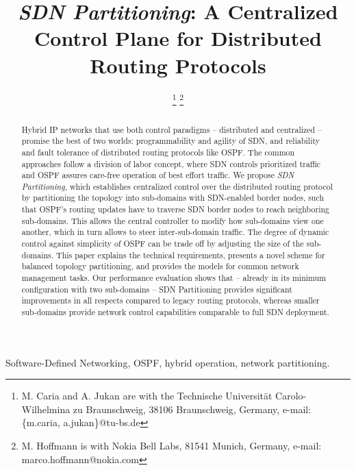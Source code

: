 \documentclass[journal]{IEEEtran}
\begin{document}
\title{\emph{SDN Partitioning}: A Centralized Control Plane for Distributed Routing Protocols}

\author{

\thanks{M. Caria and A. Jukan are with the Technische Universit\"at Carolo-Wilhelmina zu
Braunschweig, 38106 Braunschweig, Germany, e-mail:  \{m.caria, a.jukan\}@tu-bs.de}
\thanks{M. Hoffmann is with Nokia Bell Labs, 81541 Munich, Germany, e-mail: marco.hoffmann@nokia.com}
}


\maketitle

\begin{abstract}
Hybrid IP networks that use both control paradigms -- distributed and centralized -- promise the best of two worlds: programmability and agility of SDN, and reliability and fault tolerance of distributed routing protocols like OSPF. The common approaches follow a division of labor concept, where SDN controls prioritized traffic and OSPF assures care-free operation of best effort traffic. We propose \emph{SDN Partitioning}, which establishes centralized control over the distributed routing protocol by partitioning the topology into sub-domains with SDN-enabled border nodes, such that OSPF's routing updates have to traverse SDN border nodes to reach neighboring sub-domains. This allows the central controller to modify how sub-domains view one another, which in turn allows to steer inter-sub-domain traffic. The degree of dynamic control against simplicity of OSPF can be trade off by adjusting the size of the sub-domains. This paper explains the technical requirements, presents a novel scheme for balanced topology partitioning, and provides the models for common network management tasks. Our performance evaluation shows that -- already in its minimum configuration with two sub-domains -- SDN Partitioning provides significant improvements in all respects compared to legacy routing protocols, whereas smaller sub-domains provide network control capabilities comparable to full SDN deployment.
\end{abstract}

\begin{IEEEkeywords}
Software-Defined Networking, OSPF, hybrid operation, network partitioning.
\end{IEEEkeywords}
\end{document}
